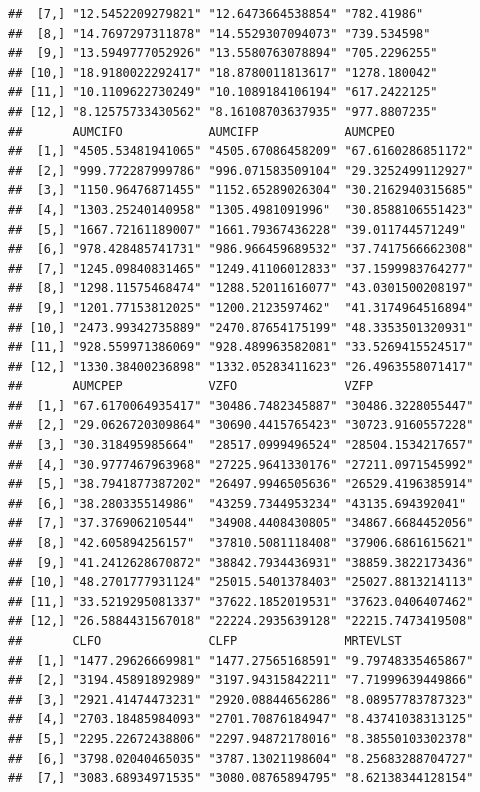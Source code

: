 \documentclass[]{krantz}
\theoremstyle{definition}
\theoremstyle{definition}
\theoremstyle{definition}
\theoremstyle{remark}
\begin{document}
\begin{verbatim}
##  [7,] "12.5452209279821" "12.6473664538854" "782.41986"   
##  [8,] "14.7697297311878" "14.5529307094073" "739.534598"  
##  [9,] "13.5949777052926" "13.5580763078894" "705.2296255" 
## [10,] "18.9180022292417" "18.8780011813617" "1278.180042" 
## [11,] "10.1109622730249" "10.1089184106194" "617.2422125" 
## [12,] "8.12575733430562" "8.16108703637935" "977.8807235" 
##       AUMCIFO            AUMCIFP            AUMCPEO           
##  [1,] "4505.53481941065" "4505.67086458209" "67.6160286851172"
##  [2,] "999.772287999786" "996.071583509104" "29.3252499112927"
##  [3,] "1150.96476871455" "1152.65289026304" "30.2162940315685"
##  [4,] "1303.25240140958" "1305.4981091996"  "30.8588106551423"
##  [5,] "1667.72161189007" "1661.79367436228" "39.011744571249" 
##  [6,] "978.428485741731" "986.966459689532" "37.7417566662308"
##  [7,] "1245.09840831465" "1249.41106012833" "37.1599983764277"
##  [8,] "1298.11575468474" "1288.52011616077" "43.0301500208197"
##  [9,] "1201.77153812025" "1200.2123597462"  "41.3174964516894"
## [10,] "2473.99342735889" "2470.87654175199" "48.3353501320931"
## [11,] "928.559971386069" "928.489963582081" "33.5269415524517"
## [12,] "1330.38400236898" "1332.05283411623" "26.4963558071417"
##       AUMCPEP            VZFO               VZFP              
##  [1,] "67.6170064935417" "30486.7482345887" "30486.3228055447"
##  [2,] "29.0626720309864" "30690.4415765423" "30723.9160557228"
##  [3,] "30.318495985664"  "28517.0999496524" "28504.1534217657"
##  [4,] "30.9777467963968" "27225.9641330176" "27211.0971545992"
##  [5,] "38.7941877387202" "26497.9946505636" "26529.4196385914"
##  [6,] "38.280335514986"  "43259.7344953234" "43135.694392041" 
##  [7,] "37.376906210544"  "34908.4408430805" "34867.6684452056"
##  [8,] "42.605894256157"  "37810.5081118408" "37906.6861615621"
##  [9,] "41.2412628670872" "38842.7934436931" "38859.3822173436"
## [10,] "48.2701777931124" "25015.5401378403" "25027.8813214113"
## [11,] "33.5219295081337" "37622.1852019531" "37623.0406407462"
## [12,] "26.5884431567018" "22224.2935639128" "22215.7473419508"
##       CLFO               CLFP               MRTEVLST          
##  [1,] "1477.29626669981" "1477.27565168591" "9.79748335465867"
##  [2,] "3194.45891892989" "3197.94315842211" "7.71999639449866"
##  [3,] "2921.41474473231" "2920.08844656286" "8.08957783787323"
##  [4,] "2703.18485984093" "2701.70876184947" "8.43741038313125"
##  [5,] "2295.22672438806" "2297.94872178016" "8.38550103302378"
##  [6,] "3798.02040465035" "3787.13021198604" "8.25683288704727"
##  [7,] "3083.68934971535" "3080.08765894795" "8.62138344128154"

\end{verbatim}
\end{document}
